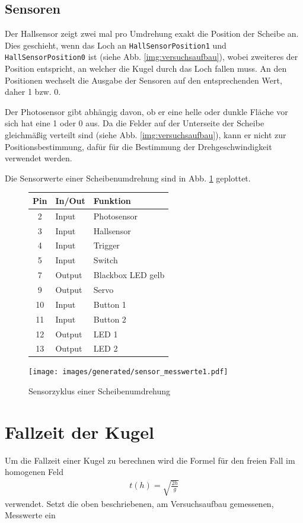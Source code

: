 \subsection{Sensoren}
Der Hallsensor zeigt zwei mal pro Umdrehung exakt die Position der Scheibe an.
Dies geschieht, wenn das Loch an \texttt{HallSensorPosition1} und \texttt{HallSensorPosition0} ist (siehe Abb. \ref{img:versuchsaufbau}), wobei zweiteres der Position entspricht, an welcher die Kugel durch das Loch fallen muss.
An den Positionen wechselt die Ausgabe der Sensoren auf den entsprechenden Wert, daher 1 bzw. 0.

Der Photosensor gibt abhängig davon, ob er eine helle oder dunkle Fläche vor sich hat eine 1 oder 0 aus.
Da die Felder auf der Unterseite der Scheibe gleichmäßig verteilt sind (siehe Abb. \ref{img:versuchsaufbau}), kann er nicht zur Positionsbestimmung, dafür für die Bestimmung der Drehgeschwindigkeit verwendet werden.

Die Sensorwerte einer Scheibenumdrehung sind in Abb. \ref{img:sensorwerte} geplottet.

\begin{figure}[h] \centering
\begin{tabular}{cll} 
	\textbf{Pin} 	& \textbf{In/Out} & \textbf{Funktion}	\\
	\toprule
	2 &	Input &	Photosensor \\
	3 &	Input &	Hallsensor\\
	4 &	Input &	Trigger\\
	5 &	Input &	Switch\\
	7 &	Output &	Blackbox LED gelb\\
	9 &	Output &	Servo\\
	10 &	Input &	Button 1\\
	11 &	Input &	Button 2\\
	12 &	Output &	LED 1\\
	13 &	Output &	LED 2\\
	\bottomrule
\end{tabular}
\end{figure}

\begin{figure}[h] \centering
	\texttt{[image: images/generated/sensor\_messwerte1.pdf]}
	\caption{Sensorzyklus einer Scheibenumdrehung}
	\label{img:sensorwerte}
\end{figure}

\section{Fallzeit der Kugel}
Um die Fallzeit einer Kugel zu berechnen wird die Formel für den freien Fall im homogenen Feld
\begin{align}
	t(h) = \sqrt{\frac{2h}{g}}
\end{align}
verwendet.
Setzt die oben beschriebenen, am Versuchsaufbau gemessenen, Messwerte ein

